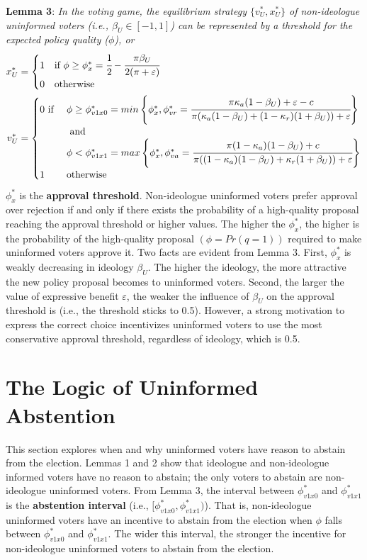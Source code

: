 \documentclass[doc,natbib,12pt]{apa6}
\begin{document}
	\noindent \textbf{Lemma 3}: \textit{In the voting game, the equilibrium strategy $\{v^*_U, x^*_U\}$ of non-ideologue uninformed voters (i.e., $\beta_U \in [-1, 1]$) can be represented by a threshold for the expected policy quality ($\phi$), or} 
	\begin{align}
	x^*_U &= 
	\begin{cases}
	1 & \text{if } \phi \geq \phi^*_x = \cfrac{1}{2} - \cfrac{\pi \beta_U}{2(\pi + \varepsilon)}\\
	0 & \text{otherwise}
	\end{cases} \\
	v^*_U &= 
	\begin{cases}
	0 \text{ if } 
	&\phi \geq \phi^*_{v1x0} = min\left\{ \phi^*_x, \phi^*_{vr} = \cfrac{\pi \kappa_{a} (1-\beta_U) + \varepsilon - c}{\pi (\kappa_{a} (1-\beta_U) + (1-\kappa_{r}) (1 + \beta_U))+ \varepsilon} \right\} \\
	&\text{ and } \\ 
	&\phi < \phi^*_{v1x1} =max\left\{ \phi^*_x,  \phi^*_{va} = \cfrac{\pi (1 - \kappa_{a}) (1-\beta_U) + c}{\pi ((1-\kappa_{a}) (1-\beta_U) + \kappa_{r} (1 + \beta_U)) + \varepsilon} \right\} \\
	1 &\text{otherwise}
	\end{cases} 
	\end{align}
	\noindent  $\phi^*_x$ is the \textbf{approval threshold}. Non-ideologue uninformed voters prefer approval over rejection if and only if there exists the probability of a high-quality proposal reaching the approval threshold or higher values. The higher the $\phi^*_x$, the higher is the probability of the high-quality proposal $(\phi = Pr(q=1))$ required to make uninformed voters approve it. Two facts are evident from Lemma 3. First, $\phi^*_x$ is weakly decreasing in ideology $\beta_U$. The higher the ideology, the more attractive the new policy proposal becomes to uninformed voters. Second, the larger the value of expressive benefit $\varepsilon$, the weaker the influence of $\beta_U$ on the approval threshold is (i.e., the threshold sticks to 0.5). However, a strong motivation to express the correct choice incentivizes uninformed voters to use the most conservative approval threshold, regardless of ideology, which is 0.5.
	
	\section{The Logic of Uninformed Abstention}
	
	\par This section explores when and why uninformed voters have reason to abstain from the election. Lemmas 1 and 2 show that ideologue and non-ideologue informed voters have no reason to abstain; the only voters to abstain are non-ideologue uninformed voters. From Lemma 3, the interval between $\phi^*_{v1x0}$ and $\phi^*_{v1x1}$ is the \textbf{abstention interval} (i.e., $[\phi^*_{v1x0},  \phi^*_{v1x1})$). That is, non-ideologue uninformed voters have an incentive to abstain from the election when $\phi$ falls between $\phi^*_{v1x0}$ and $\phi^*_{v1x1}$. The wider this interval, the stronger the incentive for non-ideologue uninformed voters to abstain from the election.
	
\end{document}

